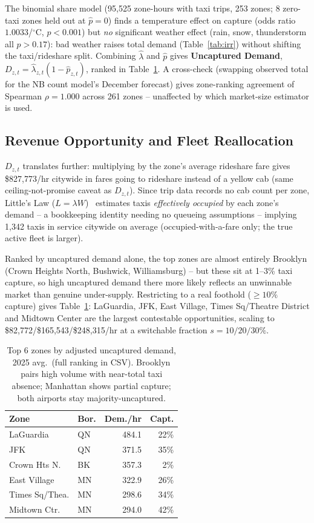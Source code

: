 \documentclass[11pt]{article}
\begin{document}
The binomial share model (95,525 zone-hours with taxi trips, 253 zones; 8 zero-taxi zones held out at $\hat p = 0$) finds a temperature effect on capture (odds ratio $1.0033$/$^\circ$C, $p<0.001$) but \emph{no} significant weather effect (rain, snow, thunderstorm all $p>0.17$): bad weather raises total demand (Table~\ref{tab:irr}) without shifting the taxi/rideshare split. Combining $\hat\lambda$ and $\hat p$ gives \textbf{Uncaptured Demand}, $D_{z,t} = \hat\lambda_{z,t}(1-\hat p_{z,t})$, ranked in Table~\ref{tab:uncaptured_demand}. A cross-check (swapping observed total for the NB count model's December forecast) gives zone-ranking agreement of Spearman $\rho = 1.000$ across 261 zones -- unaffected by which market-size estimator is used.

\subsection{Revenue Opportunity and Fleet Reallocation}

$D_{z,t}$ translates further: multiplying by the zone's average rideshare fare gives \$827{,}773/hr citywide in fares going to rideshare instead of a yellow cab (same ceiling-not-promise caveat as $D_{z,t}$). Since trip data records no cab count per zone, Little's Law ($L=\lambda W$)~\cite{ross_probability_models} estimates taxis \emph{effectively occupied} by each zone's demand -- a bookkeeping identity needing no queueing assumptions -- implying 1{,}342 taxis in service citywide on average (occupied-with-a-fare only; the true active fleet is larger).

Ranked by uncaptured demand alone, the top zones are almost entirely Brooklyn (Crown Heights North, Bushwick, Williamsburg) -- but these sit at 1--3\% taxi capture, so high uncaptured demand there more likely reflects an unwinnable market than genuine under-supply. Restricting to a real foothold ($\geq10\%$ capture) gives Table~\ref{tab:uncaptured_demand}: LaGuardia, JFK, East Village, Times Sq/Theatre District and Midtown Center are the largest contestable opportunities, scaling to \$82{,}772/\$165{,}543/\$248{,}315/hr at a switchable fraction $s=10/20/30\%$.

\begin{table}[htbp]
\centering
\scriptsize
\begin{tabular}{llrr}
\toprule
Zone & Bor. & Dem./hr & Capt. \\
\midrule
LaGuardia         & QN & 484.1 & 22\% \\
JFK               & QN & 371.5 & 35\% \\
Crown Hts N.      & BK & 357.3 & 2\%  \\
East Village      & MN & 322.9 & 26\% \\
Times Sq/Thea.    & MN & 298.6 & 34\% \\
Midtown Ctr.      & MN & 294.0 & 42\% \\
\bottomrule
\end{tabular}
\caption{Top 6 zones by adjusted uncaptured demand, 2025 avg.\ (full ranking in CSV). Brooklyn pairs high volume with near-total taxi absence; Manhattan shows partial capture; both airports stay majority-uncaptured.}
\label{tab:uncaptured_demand}
\end{table}
\end{document}
